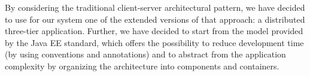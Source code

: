By considering the traditional client-server architectural pattern, we have decided to use for our system one of the extended versions of that approach: a distributed three-tier application.
\newline
Further, we have decided to start from the model provided by the Java EE standard, which offers the possibility to reduce development time (by using conventions and annotations) and to abstract from the application complexity by organizing the architecture into components and containers.